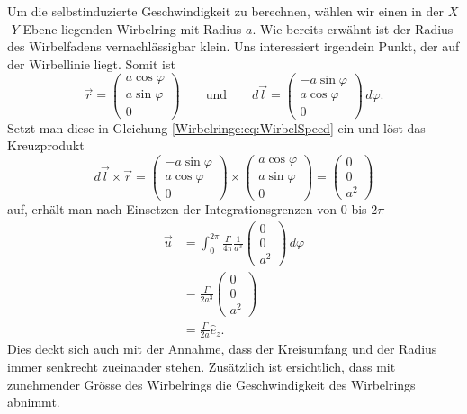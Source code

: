 Um die selbstinduzierte Geschwindigkeit zu berechnen, wählen wir einen in der \(X\)-\(Y\) Ebene liegenden Wirbelring mit Radius \(a\).
Wie bereits erwähnt ist der Radius des Wirbelfadens vernachlässigbar klein.
Uns interessiert irgendein Punkt, der auf der Wirbellinie liegt.
Somit ist
\[
\vec{r} = 
\begin{pmatrix}
    a \cos \varphi\\
    a \sin \varphi\\
    0    
\end{pmatrix}
\qquad
\text{und}
\qquad
d\vec{l} = 
\begin{pmatrix}
    -a \sin \varphi\\
    a \cos \varphi\\
    0    
\end{pmatrix}
\,d\varphi .
\] 
Setzt man diese in Gleichung \eqref{Wirbelringe:eq:WirbelSpeed} ein und löst das Kreuzprodukt 
\[
d\vec{l}\times\vec{r} 
= 
\begin{pmatrix}
    -a \sin \varphi\\
    a \cos \varphi\\
    0
\end{pmatrix}
\times
\begin{pmatrix}
    a \cos \varphi\\
    a \sin \varphi\\
    0    
\end{pmatrix}
=
\begin{pmatrix}
    0\\
    0\\
    a^2
\end{pmatrix}
\]
auf, erhält man nach Einsetzen der Integrationsgrenzen von 0 bis \(2\pi\)
\begin{align*}
\vec{u}
&=
\int_{0}^{2\pi} \frac{\Gamma}{4\pi}\frac{1}{a^3}
\begin{pmatrix}
    0\\
    0\\
    a^2
\end{pmatrix}
\,d\varphi\\
&=\frac{\Gamma}{2a^3}
\begin{pmatrix}
    0\\
    0\\
    a^2
\end{pmatrix}\\
&=\frac{\Gamma}{2a}\hat{e}_z.
\end{align*}    
Dies deckt sich auch mit der Annahme, dass der Kreisumfang und der Radius immer senkrecht zueinander stehen.
Zusätzlich ist ersichtlich, dass mit zunehmender Grösse des Wirbelrings die Geschwindigkeit des Wirbelrings abnimmt.

